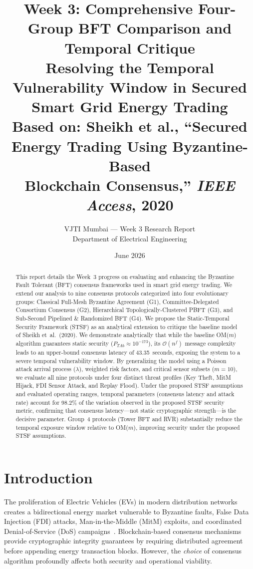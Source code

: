 \documentclass[10pt,twocolumn,letterpaper]{article}
\title{\textbf{Week 3: Comprehensive Four-Group BFT Comparison and Temporal Critique}\\[6pt]
\large Resolving the Temporal Vulnerability Window in Secured Smart Grid Energy Trading\\[4pt]
\normalsize Based on: Sheikh et al., ``Secured Energy Trading Using Byzantine-Based\\Blockchain Consensus,'' \emph{IEEE Access}, 2020}
\author{%
VJTI Mumbai --- Week 3 Research Report\\
Department of Electrical Engineering
}
\date{June 2026}
\begin{document}
\maketitle

\begin{abstract}
This report details the Week~3 progress on evaluating and enhancing the Byzantine Fault Tolerant (BFT) consensus frameworks used in smart grid energy trading. We extend our analysis to nine consensus protocols categorized into four evolutionary groups: Classical Full-Mesh Byzantine Agreement (G1), Committee-Delegated Consortium Consensus (G2), Hierarchical Topologically-Clustered PBFT (G3), and Sub-Second Pipelined \& Randomized BFT (G4). We propose the Static-Temporal Security Framework (STSF) as an analytical extension to critique the baseline model of Sheikh et~al.\ (2020). We demonstrate analytically that while the baseline OM($m$) algorithm guarantees static security ($P_{TAb} \approx 10^{-173}$), its $\mathcal{O}(n^f)$ message complexity leads to an upper-bound consensus latency of 43.35~seconds, exposing the system to a severe temporal vulnerability window. By generalizing the model using a Poisson attack arrival process ($\lambda$), weighted risk factors, and critical sensor subsets ($m=10$), we evaluate all nine protocols under four distinct threat profiles (Key Theft, MitM Hijack, FDI Sensor Attack, and Replay Flood). Under the proposed STSF assumptions and evaluated operating ranges, temporal parameters (consensus latency and attack rate) account for 98.2\% of the variation observed in the proposed STSF security metric, confirming that consensus latency---not static cryptographic strength---is the decisive parameter. Group~4 protocols (Tower BFT and RVR) substantially reduce the temporal exposure window relative to OM($m$), improving security under the proposed STSF assumptions.
\end{abstract}

\section{Introduction}

The proliferation of Electric Vehicles (EVs) in modern distribution networks creates a bidirectional energy market vulnerable to Byzantine faults, False Data Injection (FDI) attacks, Man-in-the-Middle (MitM) exploits, and coordinated Denial-of-Service (DoS) campaigns~\cite{sheikh2020, li2020}. Blockchain-based consensus mechanisms provide cryptographic integrity guarantees by requiring distributed agreement before appending energy transaction blocks. However, the \emph{choice} of consensus algorithm profoundly affects both security and operational viability.
\end{document}
